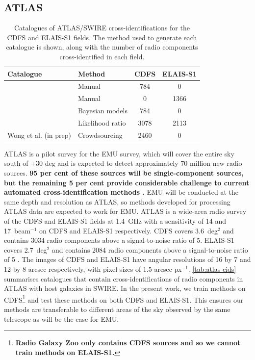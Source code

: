 \documentclass[fleqn,usenatbib,usedcolumn]{mnras}
\newcommand{\jansky}{\text{Jy}}
\newcommand{\edited}[1]{{\bf {#1}}}
\begin{document}
  \subsection{ATLAS}\label{sec:atlas}
    \begin{table}
      \caption{Catalogues of ATLAS/SWIRE cross-identifications for the CDFS
        and ELAIS-S1 fields. The method used to generate each catalogue is
        shown, along with the number of radio components cross-identified in each
        field.}
      \label{tab:atlas-cids}
      \begin{tabular}{llcc}
        \hline
        Catalogue & Method & CDFS & ELAIS-S1\\
        \hline
        \citet{norris06} & Manual & 784 & 0\\
        \citet{middelberg08} & Manual & 0 & 1366\\
        \citet{fan15} & Bayesian models & 784 & 0\\
        \citet{weston18lrpy} & Likelihood ratio & 3078 & 2113\\
        Wong et al. (in prep) & Crowdsourcing & 2460 & 0 \\
        \hline
      \end{tabular}
    \end{table}

    ATLAS is a pilot survey for the EMU \citep{norris11} survey, which will
    cover the entire sky south of $+30$ deg and is expected to detect
    approximately 70 million new radio sources. \edited{95 per cent of these sources
    will be single-component sources, but the remaining 5 per cent provide
    considerable challenge to current automated cross-identification methods
    \citep{norris11}.} EMU will be conducted at the same depth and resolution
    as ATLAS, so methods developed for processing ATLAS data are expected to
    work for EMU. ATLAS is a wide-area radio survey of the CDFS and ELAIS-S1
    fields at 1.4~GHz with a sensitivity of 14 and
    \unit{17}{\micro\jansky}~beam$^{-1}$ on CDFS and ELAIS-S1 respectively.
    CDFS covers 3.6~deg$^2$ and contains 3034 radio components above a
    signal-to-noise ratio of 5. ELAIS-S1 covers 2.7~deg$^2$ and contains 2084
    radio components above a signal-to-noise ratio of 5 \citep{franzen15}. The
    images of CDFS and ELAIS-S1 have angular resolutions of 16 by 7 and 12 by
    8 arcsec respectively, with pixel sizes of 1.5 arcsec px$^{-1}$.
    \autoref{tab:atlas-cids} summarises catalogues that contain
    cross-identifications of radio components in ATLAS with host galaxies in
    SWIRE. In the present work, we train methods on
    CDFS\footnote{\edited{Radio Galaxy Zoo only contains CDFS sources and so
    we cannot train methods on ELAIS-S1.}} and test these methods on both CDFS
    and ELAIS-S1. This ensures our methods are transferable to different
    areas of the sky observed by the same telescope as will be the case for
    EMU.
\end{document}
